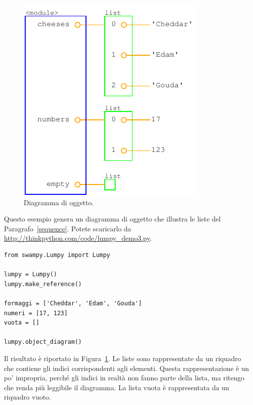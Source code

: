 \documentclass[10pt]{book}
\begin{document}
\begin{figure}
\centerline
{\includegraphics[scale=0.7]{figs/lumpydemo3.pdf}}
\caption{Diagramma di oggetto.}
\label{fig.lumpy3}
\end{figure}

Questo esempio genera un diagramma di oggetto che illustra le liste del Paragrafo~\ref{sequence}.  Potete scaricarlo da
\url{http://thinkpython.com/code/lumpy_demo3.py}.
 

\begin{verbatim}
from swampy.Lumpy import Lumpy

lumpy = Lumpy()
lumpy.make_reference()

formaggi = ['Cheddar', 'Edam', 'Gouda']
numeri = [17, 123]
vuota = []

lumpy.object_diagram()
\end{verbatim}

Il risultato è riportato in Figura~\ref{fig.lumpy3}.  Le liste sono rappresentate da un riquadro che contiene gli indici corrispondenti agli elementi. Questa rappresentazione è un po' impropria, perché gli indici in realtà non fanno parte della lista, ma ritengo che renda più leggibile il diagramma. La lista vuota è rappresentata da un riquadro vuoto.
\end{document}
